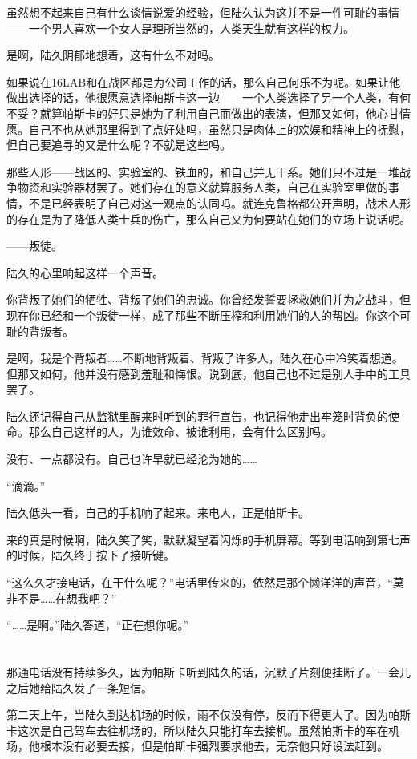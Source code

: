 虽然想不起来自己有什么谈情说爱的经验，但陆久认为这并不是一件可耻的事情——一个男人喜欢一个女人是理所当然的，人类天生就有这样的权力。

是啊，陆久阴郁地想着，这有什么不对吗。

如果说在16LAB和在战区都是为公司工作的话，那么自己何乐不为呢。如果让他做出选择的话，他很愿意选择帕斯卡这一边——一个人类选择了另一个人类，有何不妥？就算帕斯卡的好只是她为了利用自己而做出的表演，但那又如何，他心甘情愿。自己不也从她那里得到了点好处吗，虽然只是肉体上的欢娱和精神上的抚慰，但自己要追寻的又是什么呢？不就是这些吗。

那些人形——战区的、实验室的、铁血的，和自己并无干系。她们只不过是一堆战争物资和实验器材罢了。她们存在的意义就算服务人类，自己在实验室里做的事情，不是已经表明了自己对这一观点的认同吗。就连克鲁格都公开声明，战术人形的存在是为了降低人类士兵的伤亡，那么自己又为何要站在她们的立场上说话呢。

——叛徒。

陆久的心里响起这样一个声音。

你背叛了她们的牺牲、背叛了她们的忠诚。你曾经发誓要拯救她们并为之战斗，但现在你已经和一个叛徒一样，成了那些不断压榨和利用她们的人的帮凶。你这个可耻的背叛者。

是啊，我是个背叛者……不断地背叛着、背叛了许多人，陆久在心中冷笑着想道。但那又如何，他并没有感到羞耻和悔恨。说到底，他自己也不过是别人手中的工具罢了。

陆久还记得自己从监狱里醒来时听到的罪行宣告，也记得他走出牢笼时背负的使命。那么自己这样的人，为谁效命、被谁利用，会有什么区别吗。

没有、一点都没有。自己也许早就已经沦为她的……

“滴滴。”

陆久低头一看，自己的手机响了起来。来电人，正是帕斯卡。

来的真是时候啊，陆久笑了笑，默默凝望着闪烁的手机屏幕。等到电话响到第七声的时候，陆久终于按下了接听键。

“这么久才接电话，在干什么呢？”电话里传来的，依然是那个懒洋洋的声音，“莫非不是……在想我吧？”

“……是啊。”陆久答道，“正在想你呢。”\section*{}

那通电话没有持续多久，因为帕斯卡听到陆久的话，沉默了片刻便挂断了。一会儿之后她给陆久发了一条短信。

第二天上午，当陆久到达机场的时候，雨不仅没有停，反而下得更大了。因为帕斯卡这次是自己驾车去往机场的，所以陆久只能打车去接机。虽然帕斯卡的车在机场，他根本没有必要去接，但是帕斯卡强烈要求他去，无奈他只好设法赶到。

